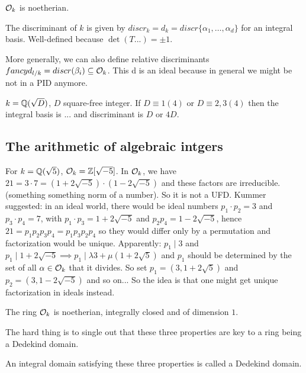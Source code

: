 \begin{outline}
\begin{corollary}
    $\mathcal{O}_k$ is noetherian. 
\end{corollary}

\begin{definition}
    The discriminant of $k$ is given by $discr_k=d_k=discr\{ \alpha_1, \ldots, \alpha_d \}$ for an integral basis. Well-defined because $\det(T...)=\pm 1$.
\end{definition}

More generally, we can also define relative discriminants $ fancy d_{l/k} = discr(\beta_i)\subseteq \mathcal{O}_k$. This d is an ideal because in general we might be not in a PID anymore. 

\begin{exercise}
    $k=\mathbb{Q}(\sqrt{D})$, $D$ square-free integer. If $D \equiv 1 (4)$ or $D \equiv 2,3 (4)$  then the integral basis is ... and discriminant is $D$ or $4D$.
\end{exercise}
\end{outline}

\subsection{The arithmetic of algebraic intgers}

\begin{outline}
\0 For $k=\mathbb{Q}(\sqrt{5})$, $\mathcal{O}_k = \mathbb{Z}[\sqrt{-5}]$. In $\mathcal{O}_k$, we have $21=3\cdot 7 = (1+2\sqrt{-5})\cdot (1-2\sqrt{-5})$ and these factors are irreducible. (something something norm of a number). So it is not a UFD. Kummer suggested: in an ideal world, there would be ideal numbers $p_1\cdot p_2 = 3$ and $p_3\cdot p_4 = 7$, with $p_1\cdot p_3 = 1+2\sqrt{-5}$ and $p_2 p_4 = 1-2\sqrt{-5}$, hence $21 = p_1p_2p_3p_4=p_1p_3p_2p_4$ so they would differ only by a permutation and factorization would be unique. Apparently: $p_1 \mid 3$ and $p_1 \mid 1+2\sqrt{-5} \implies p_1 \mid \lambda 3 + \mu (1+2\sqrt{5})$ and $p_1$ should be determined by the set of all $\alpha \in \mathcal{O}_k$ that it divides.  So set $p_1=(3,1+2\sqrt{5})$ and $p_2=(3,1-2\sqrt{-5})$ and so on... So the idea is that one might get unique factorization in ideals instead. 

\begin{theorem}
    The ring $\mathcal{O}_k$ is noetherian, integrally closed and of dimension $1$.
\end{theorem}

The hard thing is to single out that these three properties are key to a ring being a Dedekind domain. 

\begin{definition}
An integral domain satisfying these three properties is called a Dedekind domain. 
\end{definition}
\end{outline}


 